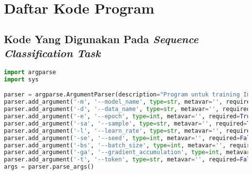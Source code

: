 \chapter*{Daftar Kode Program}
\label{Lampiran Terkait Kode Program: 7.1}

\section*{Kode Yang Digunakan Pada \emph{Sequence Classification Task}}

\begin{lstlisting}[language=Python, caption=Pengambilan parameter untuk \emph{training sequence classification task}]
import argparse
import sys

parser = argparse.ArgumentParser(description="Program untuk training IndoNLI")
parser.add_argument('-m', '--model_name', type=str, metavar='', required=True, help="Nama model Anda; String; choice=[indolem, indonlu, xlmr, your model choice]")
parser.add_argument('-d', '--data_name', type=str, metavar='', required=True, help="Nama dataset Anda; String; choice=[basic, translated, augmented]")
parser.add_argument('-e', '--epoch', type=int, metavar='', required=True, help="Jumlah epoch Anda; Integer; choice=[all integer]")
parser.add_argument('-sa', '--sample', type=str, metavar='', required=True, help="Jumlah sampling data Anda; Integer; choice=[max, all integer]")
parser.add_argument('-l', '--learn_rate', type=str, metavar='', required=False, help="Jumlah learning rate Anda; Float; choice=[all float]; default=1e-5", default=1e-5)
parser.add_argument('-se', '--seed', type=int, metavar='', required=False, help="Jumlah seed Anda; Integer; choice=[all integer]; default=42", default=42)
parser.add_argument('-bs', '--batch_size', type=int, metavar='', required=False, help="Jumlah batch-size Anda; Integer; choice=[all integer]; default=16", default=16)
parser.add_argument('-ga', '--gradient_accumulation', type=int, metavar='', required=False, help="Jumlah gradient accumulation Anda; Integer; choice=[all integer]; default=8", default=8)
parser.add_argument('-t', '--token', type=str, metavar='', required=False, help="Token Hugging Face Anda; String; choice=[all string token]; default=(TOKEN_HF_muhammadravi251001)", default="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")
args = parser.parse_args()
\end{lstlisting}

